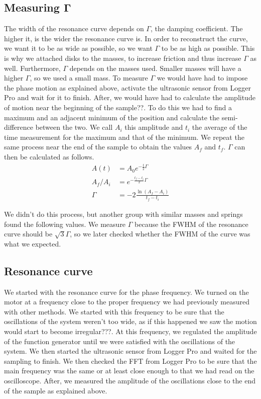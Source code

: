 \documentclass{article}
\begin{document}
\subsection{Measuring $\bm \Gamma$}
The width of the resonance curve depends on $\Gamma$, the damping coefficient. The higher it, is the wider the resonance curve is. In order to reconstruct the curve, we want it to be as wide as possible, so we want $\Gamma$ to be as high as possible. This is why we attached disks to the masses, to increase friction and thus increase $\Gamma$ as well. Furthermore, $\Gamma$ depends on the masses used. Smaller masses will have a higher $\Gamma$, so we used a small mass. %
To measure $\Gamma$ we would have had to impose the phase motion as explained above, activate the ultrasonic sensor from Logger Pro and wait for it to finish. After, we would have had to calculate the amplitude of motion near the beginning of the sample??. To do this we had to find a maximum and an adjacent minimum of the position and calculate the semi-difference between the two. We call $A_i$ this amplitude and $t_i$ the average of the time measurement for the maximum and that of the minimum. We repeat the same process near the end of the sample to obtain the values $A_f$ and $t_f$. $\Gamma$ can then be calculated as follows.
\begin{align}
    A(t) &= A_0 e^{-\frac{t}{2} \Gamma} \\
    A_f / A_i &= e^{-\frac{t_f-t_i}{2} \Gamma} \\
    \Gamma &= -2 \frac{ \ln(A_f - A_i) }{ t_f-t_i }
\end{align}

We didn't do this process, but another group with similar masses and springs found the following values. 
We measure $\Gamma$ because the FWHM of the resonance curve should be $\sqrt 3 \Gamma$, so we later checked whether the FWHM of the curve was what we expected.


\subsection{Resonance curve}
We started with the resonance curve for the phase frequency. We turned on the motor at a frequency close to the proper frequency we had previously measured with other methods. We started with this frequency to be sure that the oscillations of the system weren't too wide, as if this happened we saw the motion would start to become irregular???. At this frequency, we regulated the amplitude of the function generator until we were satisfied with the oscillations of the system. We then started the ultrasonic sensor from Logger Pro and waited for the sampling to finish. We then checked the FFT from Logger Pro to be sure that the main frequency was the same or at least close enough to that we had read on the oscilloscope. After, we measured the amplitude of the oscillations close to the end of the sample as explained above. 
\end{document}
